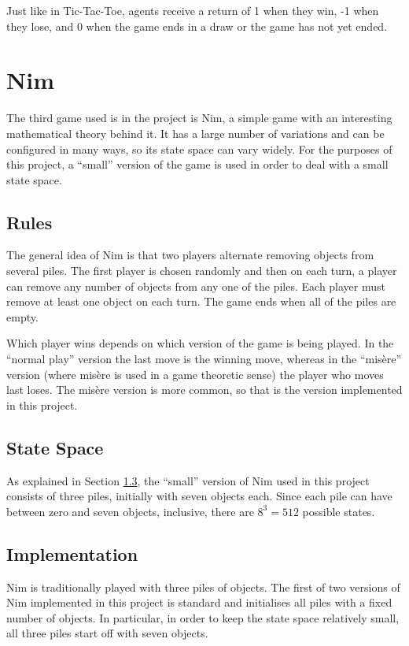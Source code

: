 \documentclass[11pt,a4paper]{report}
\begin{document}
Just like in Tic-Tac-Toe, agents receive a return of 1 when they win, -1 when they lose, and 0 when the game ends in a draw or the game has not yet ended.


\section{Nim}
\label{sec:Nim}

The third game used is in the project is Nim, a simple game with an interesting mathematical theory behind it. It has a large number of variations and can be configured in many ways, so its state space can vary widely. For the purposes of this project, a ``small'' version of the game is used in order to deal with a small state space.


\subsection{Rules}

The general idea of Nim \cite{nim-rules} is that two players alternate removing objects from several piles. The first player is chosen randomly and then on each turn, a player can remove any number of objects from any one of the piles. Each player must remove at least one object on each turn. The game ends when all of the piles are empty.

Which player wins depends on which version of the game is being played. In the ``normal play'' version the last move is the winning move, whereas in the ``mis\`ere'' version (where mis\`ere is used in a game theoretic sense) the player who moves last loses. The mis\`ere version is more common, so that is the version implemented in this project.


\subsection{State Space}

As explained in Section \ref{sec:NimImplementation}, the ``small'' version of Nim used in this project  consists of three piles, initially with seven objects each. Since each pile can have between zero and seven objects, inclusive, there are $8^3 = 512$ possible states.


\subsection{Implementation}
\label{sec:NimImplementation}

Nim is traditionally played with three piles of objects. The first of two versions of Nim implemented in this project is standard and initialises all piles with a fixed number of objects. In particular, in order to keep the state space relatively small, all three piles start off with seven objects.
\end{document}
